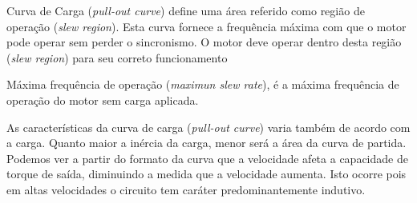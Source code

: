 Curva de Carga (\textit{pull-out curve}) define uma área referido como região de operação (\textit{slew region}). Esta curva fornece a frequência máxima com que o motor pode operar sem perder o sincronismo. O motor deve operar dentro desta região (\textit{slew region}) para seu correto funcionamento 

Máxima frequência de operação (\textit{maximun slew rate}), é a máxima frequência de operação do motor sem carga aplicada.

As características da curva de carga (\textit{pull-out curve}) varia também de acordo com a carga. Quanto maior a inércia da carga, menor será a área da curva de partida. Podemos ver a partir do formato da curva que a velocidade afeta a capacidade de torque de saída, diminuindo a medida que a velocidade aumenta. Isto ocorre pois em altas velocidades o circuito tem caráter predominantemente indutivo.


